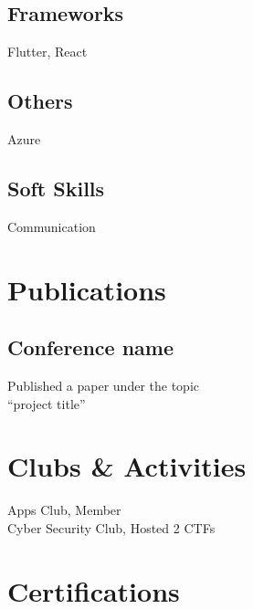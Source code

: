 \documentclass[]{deedy-resume-openfont}
\begin{document}
\begin{minipage}[t]{0.39\textwidth}
\subsection{Frameworks}
\vspace{4pt}
Flutter, React\\
\vspace{6pt}
\subsection{Others}
\vspace{4pt}
Azure\\
\vspace{6pt}
\subsection{Soft Skills}
\vspace{4pt}
Communication
\vspace{8pt}

\section{Publications}
\vspace{4pt}
\subsection{Conference name}
\vspace{2pt}
Published a paper under the topic  \\
“project title” \\
\vspace{8pt}

\section{Clubs \& Activities}
\vspace{4pt}
Apps Club, Member \\
Cyber Security Club, Hosted 2 CTFs \\
\vspace{8pt}

\section{Certifications}
\vspace{4pt}
\vspace{4pt}
\vspace{8pt}


\end{minipage}
\end{document}
